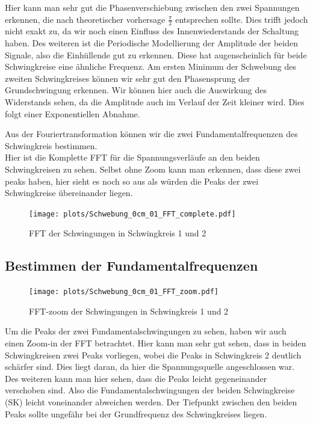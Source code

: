 \documentclass[twoside]{protokoll}
\begin{document}
Hier kann man sehr gut die Phasenverschiebung zwischen den zwei Spannungen erkennen, die nach theoretischer vorhersage $\frac{\pi}{2}$ entsprechen sollte. 
Dies trifft jedoch nicht exakt zu, da wir noch einen Einfluss des Innenwiederstands der Schaltung haben.
Des weiteren ist die Periodische Modellierung der Amplitude der beiden Signale, also die Einhüllende gut zu erkennen. 
Diese hat augenscheinlich für beide Schwingkreise eine ähnliche Frequenz.
Am ersten Minimum der Schwebung des zweiten Schwingkreises können wir sehr gut den Phasensprung der Grundschwingung erkennen.
Wir können hier auch die Auswirkung des Widerstands sehen, da die Amplitude auch im Verlauf der Zeit kleiner wird. 
Dies folgt einer Exponentiellen Abnahme.

Aus der Fouriertransformation können wir die zwei Fundamentalfrequenzen des Schwingkreis bestimmen. \\

Hier ist die Komplette FFT für die Spannungsverläufe an den beiden Schwingkreisen zu sehen. Selbst ohne Zoom kann man erkennen, dass diese zwei peaks haben, hier sieht es noch so aus als würden die Peaks der zwei Schwingkreise übereinander liegen.

\begin{figure}[H]
    \centering
    \texttt{[image: plots/Schwebung\_0cm\_01\_FFT\_complete.pdf]}
    \caption{FFT der Schwingungen in Schwingkreis 1 und 2}
\end{figure}

\subsection{Bestimmen der Fundamentalfrequenzen}

\begin{figure}[H]
    \centering
    \texttt{[image: plots/Schwebung\_0cm\_01\_FFT\_zoom.pdf]}
    \caption{FFT-zoom der Schwingungen in Schwingkreis 1 und 2}
\end{figure}

Um die Peaks der zwei Fundamentalschwingungen zu sehen, haben wir auch einen Zoom-in der FFT betrachtet. 
Hier kann man sehr gut sehen, dass in beiden Schwingkreisen zwei Peaks vorliegen, wobei die Peaks in Schwingkreis 2 deutlich schärfer sind. 
Dies liegt daran, da hier die Spannungsquelle angeschlossen war.\\
Des weiteren kann man hier sehen, dass die Peaks leicht gegeneinander verschoben sind. Also die Fundamentalschwingungen der beiden Schwingkreise (SK) leicht voneinander abweichen werden.
Der Tiefpunkt zwischen den beiden Peaks sollte ungefähr bei der Grundfrequenz des Schwingkreises liegen.\\
\end{document}
